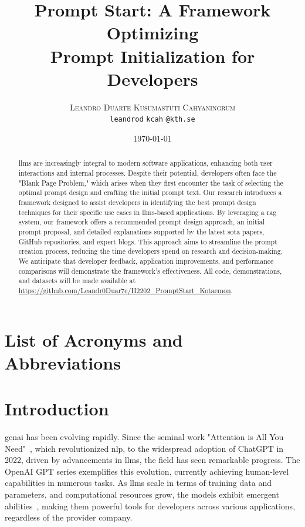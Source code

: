 \documentclass[12pt,twoside,english]{article}
\title{Prompt Start: A Framework Optimizing \\ Prompt Initialization for Developers}
\author{
        \textsc{Leandro Duarte}
            \qquad
        \textsc{Kusumastuti Cahyaningrum}
        \mbox{}\\
        \normalsize
            \texttt{leandrod}
        \textbar{}
            \texttt{kcah}
        \normalsize
            \texttt{@kth.se}
}
\date{\today}
\begin{document}
\maketitle


\begin{abstract}
\label{sec:abstract}

\Glspl{llm} are increasingly integral to modern software applications, enhancing both user interactions and internal processes. Despite their potential, developers often face the "Blank Page Problem," which arises when they first encounter the task of selecting the optimal prompt design and crafting the initial prompt text. Our research introduces a framework designed to assist developers in identifying the best prompt design techniques for their specific use cases in \glspl{llm}-based applications. By leveraging a \gls{rag} system, our framework offers a recommended prompt design approach, an initial prompt proposal, and detailed explanations supported by the latest \gls{sota} papers, GitHub repositories, and expert blogs. This approach aims to streamline the prompt creation process, reducing the time developers spend on research and decision-making. We anticipate that developer feedback, application improvements, and performance comparisons will demonstrate the framework's effectiveness. All code, demonstrations, and datasets will be made available at \url{https://github.com/Leandr0Duar7e/II2202_PromptStart_Kotaemon}.


\end{abstract}
\clearpage

\tableofcontents
\section*{List of Acronyms and Abbreviations}
\renewcommand{\glossarysection}[2][]{} %
\printglossary[type=\acronymtype,nonumberlist]

\clearpage

\section{Introduction}

\gls{genai} has been evolving rapidly. Since the seminal work "Attention is All You Need"~\cite{vaswani2023attentionneed}, which revolutionized \gls{nlp}, to the widespread adoption of ChatGPT in 2022, driven by advancements in \glspl{llm}, the field has seen remarkable progress. The OpenAI GPT series exemplifies this evolution, currently achieving human-level capabilities in numerous tasks. As \glspl{llm} scale in terms of training data and parameters, and computational resources grow, the models exhibit emergent abilities~\cite{wei2022emergentabilitieslargelanguage}, making them powerful tools for developers across various applications, regardless of the provider company.
\end{document}
